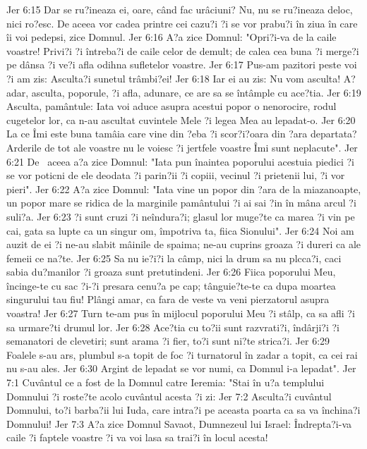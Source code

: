 Jer 6:15  Dar se ru?ineaza ei, oare, când fac urâciuni? Nu, nu se ru?ineaza deloc, nici ro?esc. De aceea vor cadea printre cei cazu?i ?i se vor prabu?i în ziua în care îi voi pedepsi, zice Domnul.
Jer 6:16  A?a zice Domnul: "Opri?i-va de la caile voastre! Privi?i ?i întreba?i de caile celor de demult; de calea cea buna ?i merge?i pe dânsa ?i ve?i afla odihna sufletelor voastre.
Jer 6:17  Pus-am pazitori peste voi ?i am zis: Asculta?i sunetul trâmbi?ei!
Jer 6:18  Iar ei au zis: Nu vom asculta! A?adar, asculta, poporule, ?i afla, adunare, ce are sa se întâmple cu ace?tia.
Jer 6:19  Asculta, pamântule: Iata voi aduce asupra acestui popor o nenorocire, rodul cugetelor lor, ca n-au ascultat cuvintele Mele ?i legea Mea au lepadat-o.
Jer 6:20  La ce Îmi este buna tamâia care vine din ?eba ?i scor?i?oara din ?ara departata? Arderile de tot ale voastre nu le voiesc ?i jertfele voastre Îmi sunt neplacute".
Jer 6:21  De  aceea a?a zice Domnul: "Iata pun înaintea poporului acestuia piedici ?i se vor poticni de ele deodata ?i parin?ii ?i copiii, vecinul ?i prietenii lui, ?i vor pieri".
Jer 6:22  A?a zice Domnul: "Iata vine un popor din ?ara de la miazanoapte, un popor mare se ridica de la marginile pamântului ?i ai sai ?in în mâna arcul ?i suli?a.
Jer 6:23  ?i sunt cruzi ?i neîndura?i; glasul lor muge?te ca marea ?i vin pe cai, gata sa lupte ca un singur om, împotriva ta, fiica Sionului".
Jer 6:24  Noi am auzit de ei ?i ne-au slabit mâinile de spaima; ne-au cuprins groaza ?i dureri ca ale femeii ce na?te.
Jer 6:25  Sa nu ie?i?i la câmp, nici la drum sa nu plcca?i, caci sabia du?manilor ?i groaza sunt pretutindeni.
Jer 6:26  Fiica poporului Meu, încinge-te cu sac ?i-?i presara cenu?a pe cap; tânguie?te-te ca dupa moartea singurului tau fiu! Plângi amar, ca fara de veste va veni pierzatorul asupra voastra!
Jer 6:27  Turn te-am pus în mijlocul poporului Meu ?i stâlp, ca sa afli ?i sa urmare?ti drumul lor.
Jer 6:28  Ace?tia cu to?ii sunt razvrati?i, îndârji?i ?i semanatori de clevetiri; sunt arama ?i fier, to?i sunt ni?te strica?i.
Jer 6:29  Foalele s-au ars, plumbul s-a topit de foc ?i turnatorul în zadar a topit, ca cei rai nu s-au ales.
Jer 6:30  Argint de lepadat se vor numi, ca Domnul i-a lepadat".
Jer 7:1  Cuvântul ce a fost de la Domnul catre Ieremia: "Stai în u?a templului Domnului ?i roste?te acolo cuvântul acesta ?i zi:
Jer 7:2  Asculta?i cuvântul Domnului, to?i barba?ii lui Iuda, care intra?i pe aceasta poarta ca sa va închina?i Domnului!
Jer 7:3  A?a zice Domnul Savaot, Dumnezeul lui Israel: Îndrepta?i-va caile ?i faptele voastre ?i va voi lasa sa trai?i în locul acesta!
